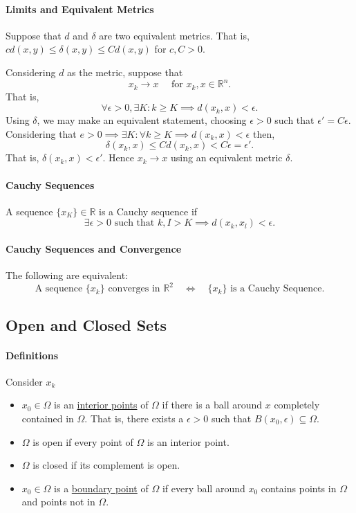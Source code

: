 \paragraph{Limits and Equivalent Metrics}
Suppose that \(d\) and \(\delta\) are two equivalent metrics.
That is, \(cd(x,y) \leq \delta (x, y) \leq Cd(x,y)\) for \(c, C > 0\).

Considering \(d\) as the metric, suppose that 
\[x_k \to x\quad\text{ for } x_k, x \in\mathbb{R}^n.\]
That is,
\[\forall \epsilon > 0, \exists K : k \geq K \implies d(x_k, x) < \epsilon.\]
Using \(\delta\), we may make an equivalent statement, choosing
\(\epsilon > 0\) such that \(\epsilon' = C\epsilon\).
Considering that \(e > 0 \implies \exists K : \forall k \geq K
\implies d(x_k, x) < \epsilon\) then, 
\[\delta (x_k, x) \leq Cd (x_k, x) < C\epsilon = \epsilon'.\]
That is, \(\delta (x_k, x) < \epsilon'.\) Hence \(x_k \to x\)
using an equivalent metric \(\delta\).

\paragraph{Cauchy Sequences}
A sequence \(\{x_K\}\in\mathbb{R}\) is a Cauchy sequence if
\[
    \exists \epsilon > 0 \text{ such that } k,I > K 
    \implies d(x_k, x_l) < \epsilon.
\]

\paragraph{Cauchy Sequences and Convergence}
The following are equivalent:
\[
    \text{A sequence \(\{x_k\}\) converges in \(\mathbb{R}^2\)}
    \quad \Longleftrightarrow \quad
    \text{\(\{x_k\}\) is a Cauchy Sequence}.
\]

\subsection{Open and Closed Sets}

\paragraph{Definitions}
Consider \(x_k \)
\begin{itemize}
    \item \(x_0\in\Omega\) is an \underline{interior points} of \(\Omega\) if there is a ball around \(x\) completely contained in \(\Omega\). That is, there exists a \(\epsilon > 0\) such that \(B(x_0, \epsilon) \subseteq \Omega\).
    \item  \(\Omega\) is open if every point of \(\Omega\) is an interior point.
    \item \(\Omega\) is closed if its complement is open.
    \item \(x_0\in\Omega\) is a \underline{boundary point} of \(\Omega\) if every ball around \(x_0\) contains points in \(\Omega\) and points not in \(\Omega\).
\end{itemize}

